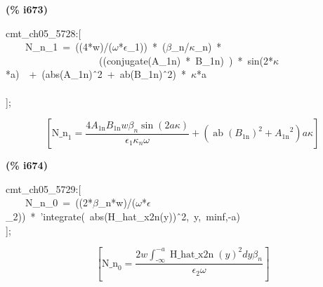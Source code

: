 \documentclass[fleqn]{article}
\begin{document}
\noindent
\begin{minipage}[t]{4.000000em}\color{red}\bfseries
(\% i673)	
\end{minipage}
\begin{minipage}[t]{\textwidth}\color{blue}
cmt\_ch05\_5728:[\\
\ \ \ \ N\_n\_1\ =\ ((4*w)/(\ensuremath{\omega}*\ensuremath{\epsilon}\_1))\ *\ (\ensuremath{\beta}\_n/\ensuremath{\kappa}\_n)\ *\ \\
\ \ \ \ \ \ \ \ \ \ \ \ \ \ \ \ \ \ \ ((conjugate(A\_1n)\ *\ B\_1n)\ )\ *\ sin(2*\ensuremath{\kappa}*a)\ \ +\ (abs(A\_1n)\^\ 2\ +\ ab(B\_1n)\^\ 2)\ *\ \ensuremath{\kappa}*a\\
\\
];
\end{minipage}
\[\displaystyle \tag{\% o673} 
\left[ {{\ensuremath{\mathrm{N\_ n}}}_1}=\frac{4 {A_{\ensuremath{\mathrm{1n}}}} {B_{\ensuremath{\mathrm{1n}}}} w {{\beta }_n} \sin{\left( 2 a \kappa \right) }}{{{\epsilon }_1} {{\kappa }_n} \omega }+\left( {{\operatorname{ab}\left( {B_{\ensuremath{\mathrm{1n}}}}\right) }^{2}}+{{{A_{\ensuremath{\mathrm{1n}}}}}^{2}}\right)  a \kappa \right] \mbox{}
\]


\noindent
\begin{minipage}[t]{4.000000em}\color{red}\bfseries
(\% i674)	
\end{minipage}
\begin{minipage}[t]{\textwidth}\color{blue}
cmt\_ch05\_5729:[\\
\ \ \ \ N\_n\_0\ =\ ((2*\ensuremath{\beta}\_n*w)/(\ensuremath{\omega}*\ensuremath{\epsilon}\_2))\ *\ 'integrate(\ abs(H\_hat\_x2n(y))\^\ 2,\ y,\ minf,-a)\\
];
\end{minipage}
\[\displaystyle \tag{\% o674} 
\left[ {{\ensuremath{\mathrm{N\_ n}}}_0}=\frac{2 w \int_{\operatorname{-}\infty }^{-a}{\left. {{\operatorname{H\_ hat\_ x2n}(y)}^{2}}dy\right.} {{\beta }_n}}{{{\epsilon }_2} \omega }\right] \mbox{}
\]
\end{document}
